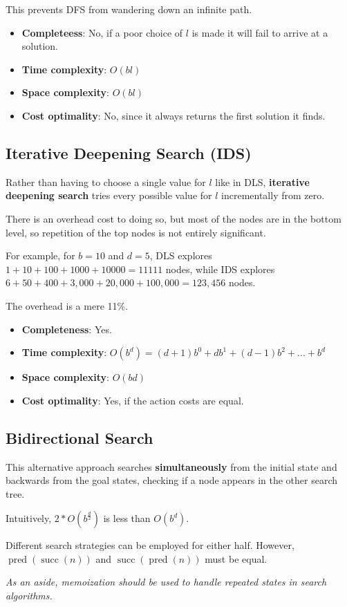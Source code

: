 This prevents DFS from wandering down an infinite path.

\begin{itemize}
    \item \textbf{Completeess}: No, if a poor choice of $l$ is made it will fail to arrive at a solution.
    \item \textbf{Time complexity}: $O(bl)$
    \item \textbf{Space complexity}: $O(bl)$
    \item \textbf{Cost optimality}: No, since it always returns the first solution it finds.
\end{itemize}


\subsection{Iterative Deepening Search (IDS)}

Rather than having to choose a single value for $l$ like in DLS, \textbf{iterative deepening search} tries every possible value for $l$ incrementally from zero.

There is an overhead cost to doing so, but most of the nodes are in the bottom level, so repetition of the top nodes is not entirely significant.

For example, for $b = 10$ and $d = 5$, DLS explores $1 + 10 + 100 + 1000 + 10000 = 11111$ nodes, while IDS explores $6 + 50 + 400 + 3,000 + 20,000 + 100,000 = 123,456$ nodes.

The overhead is a mere 11\%.

\begin{itemize}
    \item \textbf{Completeness}: Yes.
    \item \textbf{Time complexity}: $O(b^d) = (d+1)b^0 + db^1 + (d-1)b^2 + ... + b^d$
    \item \textbf{Space complexity}: $O(bd)$
    \item \textbf{Cost optimality}:  Yes, if the action costs are equal.
\end{itemize}


\subsection{Bidirectional Search}

This alternative approach searches \textbf{simultaneously} from the initial state and backwards from the goal states, checking if a node appears in the other search tree.

Intuitively, $2 * O(b^{\frac{d}{2}})$ is less than $O(b^d)$.

Different search strategies can be employed for either half. However, $\operatorname{pred}(\operatorname{succ}(n))$ and $\operatorname{succ}(\operatorname{pred}(n))$ must be equal.

\emph{As an aside, memoization should be used to handle repeated states in search algorithms.}